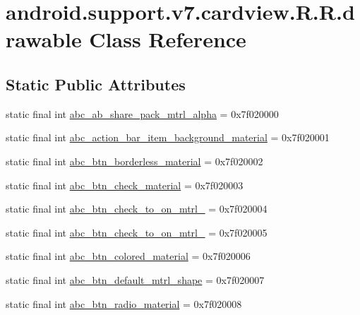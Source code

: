 \hypertarget{classandroid_1_1support_1_1v7_1_1cardview_1_1_r_1_1drawable}{
\section{android.support.v7.cardview.R.R.drawable Class Reference}
\label{classandroid_1_1support_1_1v7_1_1cardview_1_1_r_1_1drawable}
}
\subsection*{Static Public Attributes}
\begin{CompactItemize}
\item 
static final int \hyperlink{classandroid_1_1support_1_1v7_1_1cardview_1_1_r_1_1drawable_f954bfa46911951b81df00bb17c08009}{abc\_\-ab\_\-share\_\-pack\_\-mtrl\_\-alpha} = 0x7f020000
\item 
static final int \hyperlink{classandroid_1_1support_1_1v7_1_1cardview_1_1_r_1_1drawable_2b1251b00233aede41f4b8eed04eab7a}{abc\_\-action\_\-bar\_\-item\_\-background\_\-material} = 0x7f020001
\item 
static final int \hyperlink{classandroid_1_1support_1_1v7_1_1cardview_1_1_r_1_1drawable_c60da12b8cdba8ce10c2255ec3b50ac0}{abc\_\-btn\_\-borderless\_\-material} = 0x7f020002
\item 
static final int \hyperlink{classandroid_1_1support_1_1v7_1_1cardview_1_1_r_1_1drawable_ac552043f7f33b84998b2a8e4cfd61de}{abc\_\-btn\_\-check\_\-material} = 0x7f020003
\item 
static final int \hyperlink{classandroid_1_1support_1_1v7_1_1cardview_1_1_r_1_1drawable_b8195bd8e21eec359c5fed906fe22856}{abc\_\-btn\_\-check\_\-to\_\-on\_\-mtrl\_} = 0x7f020004
\item 
static final int \hyperlink{classandroid_1_1support_1_1v7_1_1cardview_1_1_r_1_1drawable_28d6504aee5e266d5ba3cc22fe6eec3a}{abc\_\-btn\_\-check\_\-to\_\-on\_\-mtrl\_} = 0x7f020005
\item 
static final int \hyperlink{classandroid_1_1support_1_1v7_1_1cardview_1_1_r_1_1drawable_63b33463669768a2b15b1cce2928c18f}{abc\_\-btn\_\-colored\_\-material} = 0x7f020006
\item 
static final int \hyperlink{classandroid_1_1support_1_1v7_1_1cardview_1_1_r_1_1drawable_32dea6104515641bfd2b49146700d43c}{abc\_\-btn\_\-default\_\-mtrl\_\-shape} = 0x7f020007
\item 
static final int \hyperlink{classandroid_1_1support_1_1v7_1_1cardview_1_1_r_1_1drawable_2b3ac3a027d7d78d04f3c83cc48e0db5}{abc\_\-btn\_\-radio\_\-material} = 0x7f020008

\end{CompactItemize}
